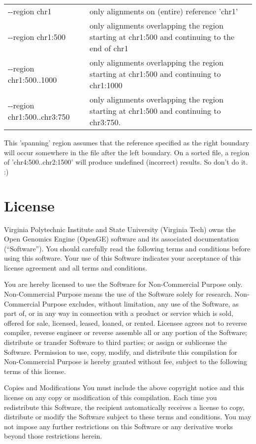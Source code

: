 \documentclass[11pt]{article}
\begin{document}
\begin{center}
\begin{tabular}{lp{3.5in}}
{-}{-}region chr1&only alignments on (entire) reference 'chr1'\\
{-}{-}region chr1:500&only alignments overlapping the region starting at chr1:500 and continuing to the end of chr1\\
{-}{-}region chr1:500..1000&only alignments overlapping the region starting at chr1:500 and continuing to chr1:1000\\
{-}{-}region chr1:500..chr3:750&only alignments overlapping the region starting at chr1:500 and continuing to chr3:750.\\
\end{tabular}
\end{center}

This 'spanning' region assumes that the reference specified as the right boundary will occur somewhere in the file after the left boundary. On a sorted file, a region of 'chr4:500..chr2:1500' will produce undefined (incorrect) results. So don't do it. :)

\newpage
\section {License}

Virginia Polytechnic Institute and State University (Virginia Tech) owns the Open Genomics Engine (OpenGE) software and its associated documentation (“Software”).  You should carefully read the following terms and conditions before using this software.  Your use of this Software indicates your acceptance of this license agreement and all terms and conditions. 

You are hereby licensed to use the Software for Non-Commercial Purpose only.  Non-Commercial Purpose means the use of the Software solely for research.  Non-Commercial Purpose excludes, without limitation, any use of the Software, as part of, or in any way in connection with a product or service which is sold, offered for sale, licensed, leased, loaned, or rented.  Licensee agrees not to reverse compiler, reverse engineer or reverse assemble all or any portion of the Software; distribute or transfer Software to third parties; or assign or sublicense the Software.  Permission to use, copy, modify, and distribute this compilation for Non-Commercial Purpose is hereby granted without fee, subject to the following terms of this license.  

Copies and Modifications
You must include the above copyright notice and this license on any copy or modification of this compilation.  Each time you redistribute this Software, the recipient automatically receives a license to copy, distribute or modify the Software subject to these terms and conditions.  You may not impose any further restrictions on this Software or any derivative works beyond those restrictions herein.
\end{document}
